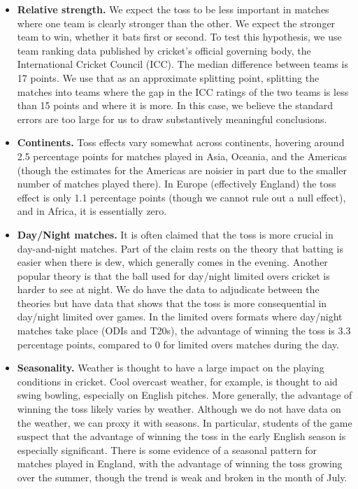 \documentclass[12pt, letterpaper]{article}
\begin{document}
\begin{itemize}
\item \textbf{Relative strength.} We expect the toss to be less important in matches where one team is clearly stronger than the other. We expect the stronger team to win, whether it bats first or second. To test this hypothesis, we use team ranking data published by cricket's official governing body, the International Cricket Council (ICC). The median difference between teams is 17 points. We use that as an approximate splitting point, splitting the matches into teams where the gap in the ICC ratings of the two teams is less than 15 points and where it is more. In this case, we believe the standard errors are too large for us to draw substantively meaningful conclusions. 

\item \textbf{Continents.} Toss effects vary somewhat across continents, hovering around 2.5 percentage points for matches played in Asia, Oceania, and the Americas (though the estimates for the Americas are noisier in part due to the smaller number of matches played there). In Europe (effectively England) the toss effect is only 1.1 percentage points (though we cannot rule out a null effect), and in Africa, it is essentially zero. 

\item \textbf{Day/Night matches.} It is often claimed that the toss is more crucial in day-and-night matches. Part of the claim rests on the theory that batting is easier when there is dew, which generally comes in the evening. Another popular theory is that the ball used for day/night limited overs cricket is harder to see at night. We do have the data to adjudicate between the theories but have data that shows that the toss is more consequential in day/night limited over games. In the limited overs formats where day/night matches take place (ODIs and T20s), the advantage of winning the toss is 3.3 percentage points, compared to 0 for limited overs matches during the day. 

\item \textbf{Seasonality.} Weather is thought to have a large impact on the playing conditions in cricket. Cool overcast weather, for example, is thought to aid swing bowling, especially on English pitches. More generally, the advantage of winning the toss likely varies by weather. Although we do not have data on the weather, we can proxy it with seasons. In particular, students of the game suspect that the advantage of winning the toss in the early English season is especially significant. There is some evidence of a seasonal pattern for matches played in England, with the advantage of winning the toss growing over the summer, though the trend is weak and broken in the month of July.


\end{itemize}
\end{document}
